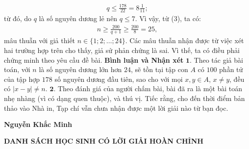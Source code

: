 \begin{multicols}{2}
	\begin{align*}
		q \le \frac{{178}}{{22}} = 8\frac{1}{{11}};
	\end{align*}
	từ đó, do $q$ là số nguyên dương lẻ nên $q \le 7$. Vì vậy, từ ($3$), ta có:
	\begin{align*}
		n \ge \frac{{200}}{{q + 1}} \ge \frac{{200}}{8} = 25,
	\end{align*}
	mâu thuẫn với giả thiết $n \in \{1; 2; \ldots; 24\}$.
	\vskip 0.05cm
	Các mâu thuẫn nhận được từ việc xét hai trường hợp trên cho thấy, giả sử phản chứng là sai. Vì thế, ta có điều phải chứng minh theo yêu cầu đề bài.
	\vskip 0.05cm
	\textbf{\color{thachthuctoanhoc}Bình luận và Nhận xét}
	\vskip 0.05cm
	$\pmb{1.}$ Theo tác giả bài toán, với $n$ là số nguyên dương lớn hơn $24$, sẽ tồn tại tập con $A$ có $100$ phần tử của tập hợp $178$ số nguyên dương đầu tiên, sao cho với mọi $x, y \in A$, $x \ne y$, đều có $|x-y| \ne n$.
	\vskip 0.05cm 
	$\pmb{2.}$ Theo đánh giá của người chấm bài, bài đã ra là một bài toán nhẹ nhàng (vì có dạng quen thuộc), và thú vị. Tiếc rằng, cho đến thời điểm bản thảo vào Nhà in, Tạp chí vẫn chưa nhận được một lời giải nào từ bạn đọc.
	\begin{flushright}
		\textbf{\color{thachthuctoanhoc}Nguyễn Khắc Minh}
	\end{flushright}
\end{multicols}
\begin{center}
	\textbf{\color{thachthuctoanhoc}DANH SÁCH HỌC SINH CÓ LỜI GIẢI HOÀN CHỈNH}
\end{center}
